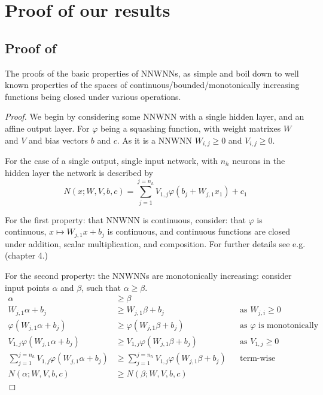 \documentclass{article} %
\newcommand{\textcite}{\cite}
\begin{document}
\section{Proof of our results}

\subsection{Proof of }
The proofs of the basic properties of NNWNNs,
as simple and boil down to well known properties of the spaces of continuous/bounded/monotonically increasing functions being closed under various operations.
\begin{proof}
	We begin by considering some NNWNN with a single hidden layer, and an affine output layer.
	For $\varphi$ being a squashing function, with weight matrixes $W$ and $V$ and bias vectors $b$ and $c$.
	As it is a NNWNN $W_{i,j} \ge 0$ and $V_{i,j} \ge 0$.
	
	For the case of a single output, single input network, with $n_h$ neurons in the hidden layer the network is described by
	\begin{equation}
	N(x;W,V,b,c) = \sum_{j=1}^{j=n_h} V_{1,j} \varphi (b_j+W_{j,1}x_1) + c_1
	\end{equation}

	For the first property: that NNWNN is continuous,
	consider: that $\varphi$ is continuous,
	$x \mapsto W_{j,1}x + b_j$ is continuous,
	and continuous functions are closed under addition, scalar multiplication, and composition.
	For further details see e.g. \textcite{rudin1976principles} (chapter 4.)
	
	For the second property: the NNWNNs are monotonically increasing:
	consider input points $\alpha$ and $\beta$, such that $\alpha\ge\beta$.
	\begin{align}
	\alpha &\ge \beta \\
	W_{j,1}\alpha+b_j &\ge W_{j,1}\beta+b_j && \text{as $W_{j,i}\ge0$} \\
	\varphi(W_{j,1}\alpha+b_j) &\ge \varphi(W_{j,1}\beta+b_j) && \text{as $\varphi$ is monotonically increasing} \\
	V_{1,j}\varphi(W_{j,1}\alpha+b_j) &\ge V_{1,j}\varphi(W_{j,1}\beta+b_j) && \text{as $V_{1,j}\ge 0$} \\
	\sum_{j=1}^{j=n_h}V_{1,j}\varphi(W_{j,1}\alpha+b_j) &\ge \sum_{j=1}^{j=n_h}V_{1,j}\varphi(W_{j,1}\beta+b_j) && \text{term-wise} \\
	N(\alpha;W,V,b,c) &\ge N(\beta;W,V,b,c)
	\end{align}


\end{proof}
\end{document}
